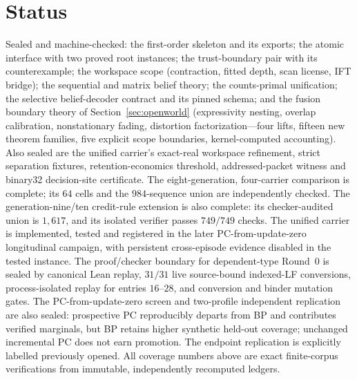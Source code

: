 \documentclass[11pt]{article}
\begin{document}
\section*{Status}

Sealed and machine-checked: the first-order skeleton and its exports; the atomic
interface with two proved root instances; the trust-boundary pair with its
counterexample; the workspace scope (contraction, fitted depth, scan license, IFT
bridge); the sequential and matrix belief theory; the counts-primal unification; the
selective belief-decoder contract and its pinned schema; and the fusion boundary theory
of Section~\ref{sec:openworld} (expressivity nesting, overlap calibration,
nonstationary fading, distortion factorization---four lifts, fifteen new theorem
families, five explicit scope boundaries, kernel-computed accounting). Also sealed are
the unified carrier's exact-real workspace refinement, strict separation fixtures,
retention-economics threshold, addressed-packet witness and binary32 decision-site
certificate. The eight-generation, four-carrier comparison is complete; its $64$ cells
and the $984$-sequence union are independently checked. The generation-nine/ten
credit-rule extension is also complete: its checker-audited union is $1{,}617$, and its
isolated verifier passes $749/749$ checks. The unified carrier is implemented, tested and
registered in the later PC-from-update-zero longitudinal campaign, with persistent
cross-episode evidence disabled in the tested instance. The proof/checker boundary for
dependent-type Round~0 is sealed by canonical Lean replay, $31/31$ live source-bound
indexed-LF conversions, process-isolated replay for entries $16$--$28$, and conversion
and binder mutation gates. The PC-from-update-zero screen and two-profile independent
replication are also sealed: prospective PC reproducibly departs from BP and contributes
verified marginals, but BP retains higher synthetic held-out coverage; unchanged
incremental PC does not earn promotion. The endpoint replication is explicitly labelled
previously opened. All coverage numbers above are exact finite-corpus verifications from
immutable, independently recomputed ledgers.
\end{document}
